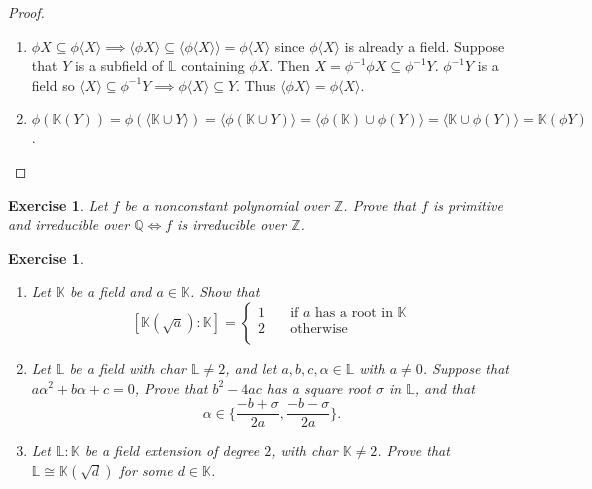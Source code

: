 \documentclass{article}
\newtheorem{exercise}[theorem]{Exercise}
\begin{document}
\begin{proof}
\begin{enumerate}[label=(\roman*)]
    \item $\phi X\subseteq \phi\langle X\rangle\implies \langle\phi X\rangle\subseteq\langle\phi\langle X\rangle\rangle=\phi\langle X\rangle$ since $\phi\langle X\rangle$ is already a field. Suppose that $Y$ is a subfield of $\mathbb{L}$ containing $\phi X$. Then $X=\phi^{-1}\phi X\subseteq\phi^{-1}Y$. $\phi^{-1}Y$ is a field so $\langle X\rangle\subseteq\phi^{-1}Y\implies \phi\langle X\rangle\subseteq Y$. Thus $\langle\phi X\rangle=\phi\langle X\rangle$.
    \item $\phi(\mathbb{K}(Y))=\phi(\langle\mathbb{K}\cup Y\rangle)=\langle\phi(\mathbb{K}\cup Y)\rangle=\langle\phi(\mathbb{K})\cup\phi(Y)\rangle=\langle\mathbb{K}\cup\phi(Y)\rangle=\mathbb{K}(\phi Y)$.
\end{enumerate}
\end{proof}

\begin{exercise}
Let $f$ be a nonconstant polynomial over $\mathbb{Z}$. Prove that $f$ is primitive and irreducible over $\mathbb{Q}\iff f$ is irreducible over $\mathbb{Z}$.
\end{exercise}

\begin{exercise}
\begin{enumerate}[label=(\roman*)]
    \item Let $\mathbb{K}$ be a field and $a\in\mathbb{K}$. Show that\[[\mathbb{K}(\sqrt{a}):\mathbb{K}] =\begin{cases}
       1 &\quad\text{if }a\text{ has a root in }\mathbb{K} \\
       2 &\quad\text{otherwise} \\ 
     \end{cases}\]
     \item Let $\mathbb{L}$ be a field with char $\mathbb{L}\neq2$, and let $a,b,c,\alpha\in\mathbb{L}$ with $a\neq0$. Suppose that $a\alpha^2+b\alpha+c=0$, Prove that $b^2-4ac$ has a square root $\sigma$ in $\mathbb{L}$, and that\[\alpha\in\{\frac{-b+\sigma}{2a},\frac{-b-\sigma}{2a}\}.\]
     \item Let $\mathbb{L}:\mathbb{K}$ be a field extension of degree $2$, with char $\mathbb{K}\neq 2$. Prove that $\mathbb{L}\cong\mathbb{K}(\sqrt{d})$ for some $d\in\mathbb{K}$.
\end{enumerate}
\end{exercise}
\end{document}
